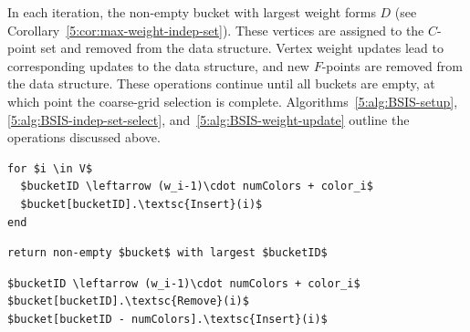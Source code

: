 \documentclass{elsart}
\begin{document}
In each iteration, the non-empty bucket with largest weight forms $D$
(see Corollary~\ref{5:cor:max-weight-indep-set}). These vertices are
assigned to the $C$-point set and removed from the data
structure. Vertex weight updates lead to corresponding updates to the
data structure, and new $F$-points are removed from the data
structure. These operations continue until all buckets are empty, at
which point the coarse-grid selection is
complete. Algorithms~\ref{5:alg:BSIS-setup},
\ref{5:alg:BSIS-indep-set-select}, and~\ref{5:alg:BSIS-weight-update}
outline the operations discussed above.
\begin{lstlisting}[caption={BSIS Data Structure Setup},label=5:alg:BSIS-setup]
%\textsc{BSIS-Setup}$(S)$%
for $i \in V$
  $bucketID \leftarrow (w_i-1)\cdot numColors + color_i$
  $bucket[bucketID].\textsc{Insert}(i)$
end
\end{lstlisting}
\begin{lstlisting}[caption={Independent Set Selection},label=5:alg:BSIS-indep-set-select]
%\textsc{BSIS-Independent-Set-Selection}$(S)$%
return non-empty $bucket$ with largest $bucketID$
\end{lstlisting}
\begin{lstlisting}[caption={BSIS Weight Update},label=5:alg:BSIS-weight-update]
%\textsc{BSIS-Weight-Update}$(S)$%
$bucketID \leftarrow (w_i-1)\cdot numColors + color_i$
$bucket[bucketID].\textsc{Remove}(i)$
$bucket[bucketID - numColors].\textsc{Insert}(i)$
\end{lstlisting}
\end{document}
